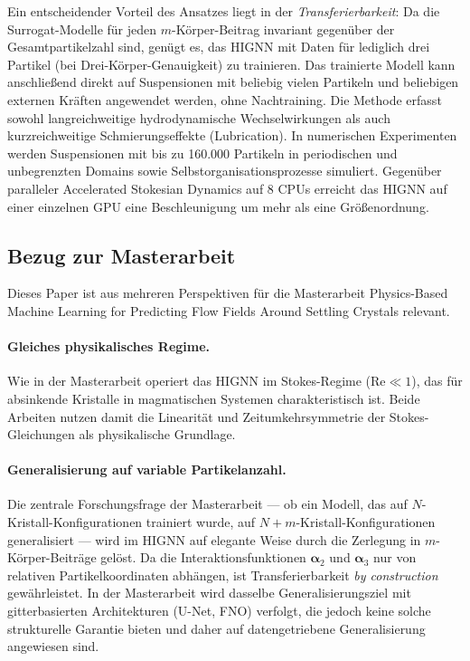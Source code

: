 \documentclass[a4paper,12pt]{article}
\begin{document}
Ein entscheidender Vorteil des Ansatzes liegt in der \emph{Transferierbarkeit}: Da die Surrogat-Modelle für jeden $m$-Körper-Beitrag invariant gegenüber der Gesamtpartikelzahl sind, genügt es, das HIGNN mit Daten für lediglich drei Partikel (bei Drei-Körper-Genauigkeit) zu trainieren. Das trainierte Modell kann anschließend direkt auf Suspensionen mit beliebig vielen Partikeln und beliebigen externen Kräften angewendet werden, ohne Nachtraining. Die Methode erfasst sowohl langreichweitige hydrodynamische Wechselwirkungen als auch kurzreichweitige Schmierungseffekte (Lubrication). In numerischen Experimenten werden Suspensionen mit bis zu 160.000 Partikeln in periodischen und unbegrenzten Domains sowie Selbstorganisationsprozesse simuliert. Gegenüber paralleler Accelerated Stokesian Dynamics auf 8 CPUs erreicht das HIGNN auf einer einzelnen GPU eine Beschleunigung um mehr als eine Größenordnung.

\subsection*{Bezug zur Masterarbeit}

Dieses Paper ist aus mehreren Perspektiven für die Masterarbeit \glqq Physics-Based Machine Learning for Predicting Flow Fields Around Settling Crystals\grqq{} relevant.

\paragraph{Gleiches physikalisches Regime.}
Wie in der Masterarbeit operiert das HIGNN im Stokes-Regime ($\mathrm{Re} \ll 1$), das für absinkende Kristalle in magmatischen Systemen charakteristisch ist. Beide Arbeiten nutzen damit die Linearität und Zeitumkehrsymmetrie der Stokes-Gleichungen als physikalische Grundlage.

\paragraph{Generalisierung auf variable Partikelanzahl.}
Die zentrale Forschungsfrage der Masterarbeit — ob ein Modell, das auf $N$-Kristall-Konfigurationen trainiert wurde, auf $N+m$-Kristall-Konfigurationen generalisiert — wird im HIGNN auf elegante Weise durch die Zerlegung in $m$-Körper-Beiträge gelöst. Da die Interaktionsfunktionen $\boldsymbol{\alpha}_2$ und $\boldsymbol{\alpha}_3$ nur von relativen Partikelkoordinaten abhängen, ist Transferierbarkeit \emph{by construction} gewährleistet. In der Masterarbeit wird dasselbe Generalisierungsziel mit gitterbasierten Architekturen (U-Net, FNO) verfolgt, die jedoch keine solche strukturelle Garantie bieten und daher auf datengetriebene Generalisierung angewiesen sind.
\end{document}
